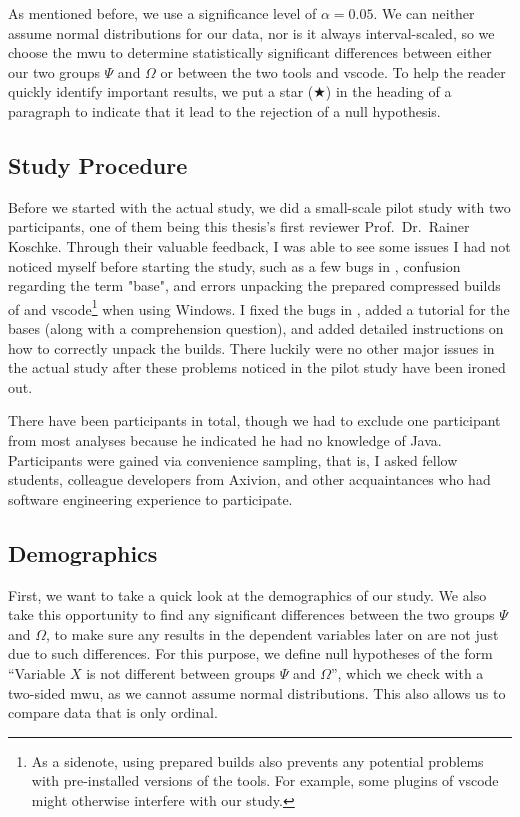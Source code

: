 \documentclass[../thesis]{subfiles}
\begin{document}
As mentioned before, we use a significance level of $\alpha = 0.05$.
We can neither assume normal distributions for our data, nor is it always interval-scaled, so we choose the \gls{mwu} to determine statistically significant differences between either our two groups $\Psi$ and $\Omega$ or between the two tools \SEE{} and \gls{vscode}.
To help the reader quickly identify important results, we put a star ($\bigstar$) in the heading of a paragraph to indicate that it lead to the rejection of a null hypothesis.

\subsection{Study Procedure}\label{subsec:procedure}
Before we started with the actual study, we did a small-scale pilot study with two participants, one of them being this thesis's first reviewer Prof.\ Dr.\ Rainer Koschke.
Through their valuable feedback, I was able to see some issues I had not noticed myself before starting the study, such as a few bugs in \SEE{}, confusion regarding the term "\gls{base}", and errors unpacking the prepared compressed builds of \SEE{} and \gls{vscode}\footnote{
	As a sidenote, using prepared builds also prevents any potential problems with pre-installed versions of the tools.
	For example, some plugins of \gls{vscode} might otherwise interfere with our study.
} when using Windows.
I fixed the bugs in \SEE{}, added a tutorial for the \glspl{base} (along with a comprehension question), and added detailed instructions on how to correctly unpack the builds.
There luckily were no other major issues in the actual study after these problems noticed in the pilot study have been ironed out.

There have been \participants participants in total, though we had to exclude one participant from most analyses because he indicated he had no knowledge of Java.
Participants were gained via convenience sampling, that is, I asked fellow students, colleague developers from Axivion, and other acquaintances who had software engineering experience to participate.

\subsection{Demographics}\label{subsec:demographics}

First, we want to take a quick look at the demographics of our study.
We also take this opportunity to find any significant differences between the two groups $\Psi$ and $\Omega$, to make sure any results in the dependent variables later on are not just due to such differences.
For this purpose, we define null hypotheses of the form \enquote{Variable $X$ is not different between groups $\Psi$ and $\Omega$}, which we check with a two-sided \gls{mwu}, as we cannot assume normal distributions.
This also allows us to compare data that is only ordinal.
\end{document}
